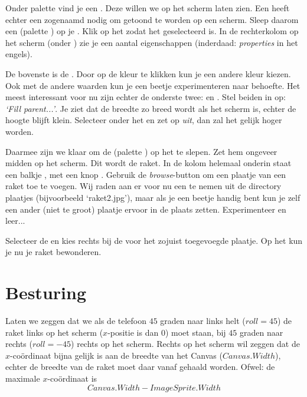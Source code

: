 Onder palette  vind je een . Deze willen we op het scherm laten zien. Een 
\linebreak {} heeft echter een zogenaamd  nodig om getoond te worden op een scherm. Sleep daarom een  (palette ) op je . Klik op het  zodat het geselecteerd is. In de rechterkolom op het scherm (onder ) zie je een aantal eigenschappen (inderdaad: \emph{properties} in het engels). 

De bovenste is de . Door op de kleur te klikken kun je een andere kleur kiezen. Ook met de andere waarden kun je een beetje experimenteren naar behoefte. Het meest interessant voor nu zijn echter de onderste twee:  en . Stel beiden in op: \emph{`Fill parent...'}. Je ziet dat de breedte zo breed wordt als het scherm is, echter de hoogte blijft klein. Selecteer onder  het  en zet  op \emph{uit}, dan zal het  gelijk hoger worden. 

Daarmee zijn we klaar om de  (palette ) op het  te slepen. Zet hem ongeveer midden op het scherm. Dit wordt de raket. In de kolom  helemaal onderin staat een balkje , met een knop . Gebruik de \emph{browse}-button om een plaatje van een raket toe te voegen. Wij raden aan er voor nu een te nemen uit de directory plaatjes (bijvoorbeeld `raket2.jpg'), maar als je een beetje handig bent kun je zelf een ander (niet te groot) plaatje ervoor in de plaats zetten. Experimenteer en leer... 

Selecteer de  en kies rechts bij de  voor  het zojuist toegevoegde plaatje. Op het  kun je nu je raket bewonderen. 

\section{Besturing}

Laten we zeggen dat we als de telefoon $45$ graden naar links helt ($roll=45$) de raket links op het scherm ($x$-positie is dan $0$) moet staan, bij $45$ graden naar rechts ($roll= -45$) rechts op het scherm. Rechts op het scherm wil zeggen dat de $x$-co\"ordinaat bijna gelijk is aan de breedte van het Canvas ($Canvas.Width$), echter de breedte van de raket moet daar vanaf gehaald worden. Ofwel: de maximale $x$-co\"ordinaat is 
\[
     Canvas.Width - ImageSprite.Width
\]


